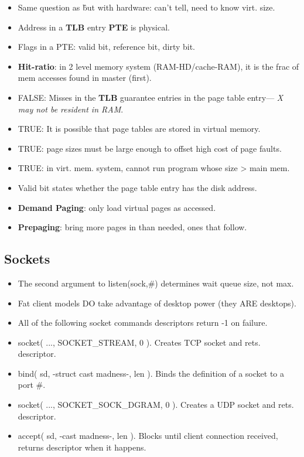 \documentclass[fontsize=4.5pt]{scrartcl}
\begin{document}
\begin{multicols}{3}
\begin{itemize}
        \item Same question as \^ but with hardware: can't tell, need to know virt. size.
        \item Address in a \textbf{TLB} entry \textbf{PTE} is physical.
        \item Flags in a PTE: valid bit, reference bit, dirty bit.
        \item \textbf{Hit-ratio}: in 2 level memory system (RAM-HD/cache-RAM), it is the frac of mem accesses found in master (first).
        \item FALSE: Misses in the \textbf{TLB} guarantee entries in the page table entry--- \textit{X may not be resident in RAM}.
        \item TRUE: It is possible that page tables are stored in virtual memory.
        \item TRUE: page sizes must be large enough to offset high cost of page faults.
        \item TRUE: in virt. mem. system, cannot run program whose size > main mem.
        \item Valid bit states whether the page table entry has the disk address.
        \item \textbf{Demand Paging}: only load virtual pages as accessed.
        \item \textbf{Prepaging}: bring more pages in than needed, ones that follow.
      \end{itemize}

    \subsection{Sockets}
      \begin{itemize}
        \item The second argument to listen(sock,\#) determines wait queue size, not max.
        \item Fat client models DO take advantage of desktop power (they ARE desktops).
        \item All of the following socket commands descriptors return -1 on failure.
        \item socket( ..., SOCKET\_STREAM, 0 ). Creates TCP socket and rets. descriptor.
        \item bind( sd, -struct cast madness-, len ). Binds the definition of a socket to a port \#.
        \item socket( ..., SOCKET\_SOCK\_DGRAM, 0 ). Creates a UDP socket and rets. descriptor.
        \item accept( sd, -cast madness-, len ). Blocks until client connection received, returns descriptor when it happens.
      \end{itemize}
    

\end{multicols}
\end{document}

